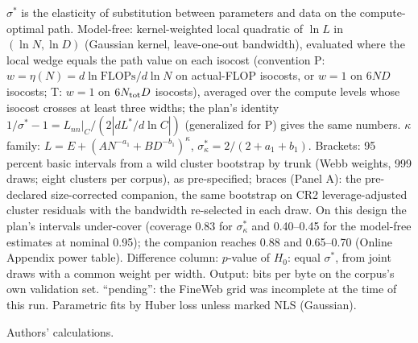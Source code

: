 \begin{table}[tp]
\begin{tablenotes}
$\sigma^*$ is the elasticity of substitution between parameters and data on the compute-optimal path. Model-free: kernel-weighted local quadratic of $\ln L$ in $(\ln N,\ln D)$ (Gaussian kernel, leave-one-out bandwidth), evaluated where the local wedge equals the path value on each isocost (convention P: $w=\eta(N)=d\ln \mathrm{FLOPs}/d\ln N$ on actual-FLOP isocosts, or $w=1$ on $6ND$ isocosts; T: $w=1$ on $6N_{\rm tot}D$ isocosts), averaged over the compute levels whose isocost crosses at least three widths; the plan's identity $1/\sigma^*-1=L_{nn}|_C/(2|dL^*/d\ln C|)$ (generalized for P) gives the same numbers. $\kappa$ family: $L=E+(AN^{-a_1}+BD^{-b_1})^{\kappa}$, $\sigma^*_\kappa=2/(2+a_1+b_1)$. Brackets: 95 percent basic intervals from a wild cluster bootstrap by trunk (Webb weights, 999 draws; eight clusters per corpus), as pre-specified; braces (Panel A): the pre-declared size-corrected companion, the same bootstrap on CR2 leverage-adjusted cluster residuals with the bandwidth re-selected in each draw. On this design the plan's intervals under-cover (coverage 0.83 for $\sigma^*_\kappa$ and 0.40--0.45 for the model-free estimates at nominal 0.95); the companion reaches 0.88 and 0.65--0.70 (Online Appendix power table). Difference column: $p$-value of $H_0$: equal $\sigma^*$, from joint draws with a common weight per width. Output: bits per byte on the corpus's own validation set. ``pending'': the FineWeb grid was incomplete at the time of this run. Parametric fits by Huber loss unless marked NLS (Gaussian).
\end{tablenotes}

\begin{tablenotes}[Source]
Authors' calculations.
\end{tablenotes}
\end{table}
